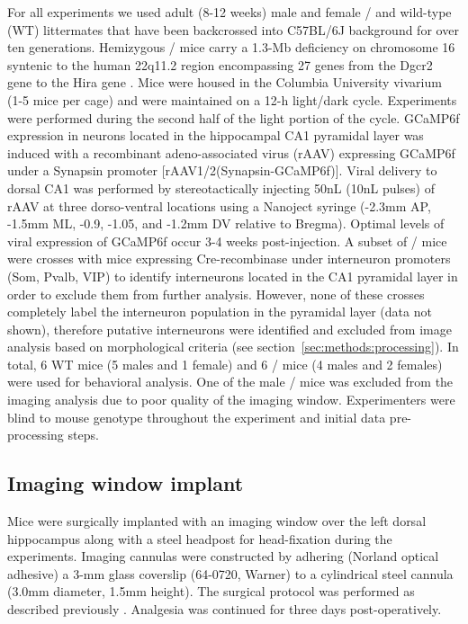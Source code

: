 For all experiments we used adult (8-12 weeks) male and female \df/ and wild-type (WT) littermates that have been backcrossed into C57BL/6J background for over ten generations. Hemizygous \df/ mice carry a 1.3-Mb deficiency on chromosome 16 syntenic to the human 22q11.2 region encompassing 27 genes from the Dgcr2 gene to the Hira gene \citep{Mukai2008}\citep{Stark2008}. Mice were housed in the Columbia University vivarium (1-5 mice per cage) and were maintained on a 12-h light/dark cycle. Experiments were performed during the second half of the light portion of the cycle.  GCaMP6f expression in neurons located in the hippocampal CA1 pyramidal layer was induced with a recombinant adeno-associated virus (rAAV) expressing GCaMP6f under a Synapsin promoter [rAAV1/2(Synapsin-GCaMP6f)]. Viral delivery to dorsal CA1 was performed by stereotactically injecting 50nL (10nL pulses) of rAAV at three dorso-ventral locations using a Nanoject syringe (-2.3mm AP, -1.5mm ML, -0.9, -1.05, and -1.2mm DV relative to Bregma). Optimal levels of viral expression of GCaMP6f occur 3-4 weeks post-injection. A subset of \df/ mice were crosses with mice expressing Cre-recombinase under interneuron promoters (Som, Pvalb, VIP) \citep{Lovett-Barron2014} to identify interneurons located in the CA1 pyramidal layer in order to exclude them from further analysis. However, none of these crosses completely label the interneuron population in the pyramidal layer (data not shown), therefore putative interneurons were identified and excluded from image analysis based on morphological criteria (see section~\ref{sec:methods:processing}). In total, 6 WT mice (5 males and 1 female) and 6 \df/ mice (4 males and 2 females) were used for behavioral analysis. One of the male \df/ mice was excluded from the imaging analysis due to poor quality of the imaging window. Experimenters were blind to mouse genotype throughout the experiment and initial data pre-processing steps.

\subsection{Imaging window implant}

Mice were surgically implanted with an imaging window over the left dorsal hippocampus along with a steel headpost for head-fixation during the experiments. Imaging cannulas were constructed by adhering (Norland optical adhesive) a 3-mm glass coverslip (64-0720, Warner) to a cylindrical steel cannula (3.0mm diameter, 1.5mm height).  The surgical protocol was performed as described previously \citep{Kaifosh2013}\citep{Lovett-Barron2014}\citep{Danielson2016b}. Analgesia was continued for three days post-operatively.

